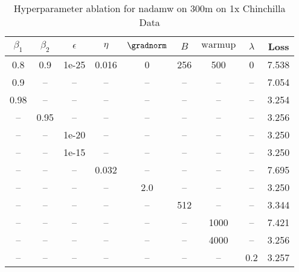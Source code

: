 \begin{table}[h!]
\centering
\caption{Hyperparameter ablation for nadamw on 300m on 1x Chinchilla Data}
\label{tab:ablation_nadamw_300m_on_1x_chinchilla_data}
\begin{tabular}{ccccccccc}
\toprule
$\beta_1$ & $\beta_2$ & $\epsilon$ & $\eta$ & $\gradnorm$ & $B$ & $\mathrm{warmup}$ & $\lambda$ & Loss \\
\midrule
0.8 & 0.9 & 1e-25 & 0.016 & 0 & 256 & 500 & 0 & 7.538 \\
\midrule
0.9 & -- & -- & -- & -- & -- & -- & -- & 7.054 \\
0.98 & -- & -- & -- & -- & -- & -- & -- & 3.254 \\
-- & 0.95 & -- & -- & -- & -- & -- & -- & 3.256 \\
-- & -- & 1e-20 & -- & -- & -- & -- & -- & 3.250 \\
-- & -- & 1e-15 & -- & -- & -- & -- & -- & 3.250 \\
-- & -- & -- & 0.032 & -- & -- & -- & -- & 7.695 \\
-- & -- & -- & -- & 2.0 & -- & -- & -- & 3.250 \\
-- & -- & -- & -- & -- & 512 & -- & -- & 3.344 \\
-- & -- & -- & -- & -- & -- & 1000 & -- & 7.421 \\
-- & -- & -- & -- & -- & -- & 4000 & -- & 3.256 \\
-- & -- & -- & -- & -- & -- & -- & 0.2 & 3.257 \\
\bottomrule
\end{tabular}
\end{table}

